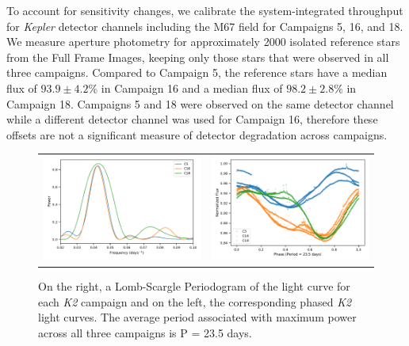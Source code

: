 \documentclass[modern,trackchanges]{aastex631}
\begin{document}
To account for sensitivity changes, we calibrate the system-integrated throughput for \emph{Kepler} detector channels including the M67 field for Campaigns 5, 16, and 18. We measure aperture photometry for approximately 2000 isolated reference stars from the Full Frame Images, keeping only those stars that were observed in all three campaigns. Compared to Campaign 5, the reference stars have a median flux of $93.9\pm4.2\%$ in Campaign 16 and a median flux of $98.2\pm2.8\%$ in Campaign 18. Campaigns 5 and 18 were observed on the same detector channel while a different detector channel was used for Campaign 16, therefore these offsets are not a significant measure of detector degradation across campaigns. 

 

\begin{figure}[ht]
    \centering
    \begin{tabular}{cc}
      \includegraphics[width=3in]{figures/AllCampaigns_Periodogram.pdf}   & \includegraphics[width=3in]{figures/AllCampaigns_Phased_Lightcurve.pdf}  \\
    \end{tabular}
    \caption{On the right, a Lomb-Scargle Periodogram of the light curve for each \emph{K2} campaign and on the left, the corresponding phased \emph{K2} light curves. The average period associated with maximum power across all three campaigns is P = 23.5 days.   }
    \label{fig:periodogram}
\end{figure}
\end{document}
